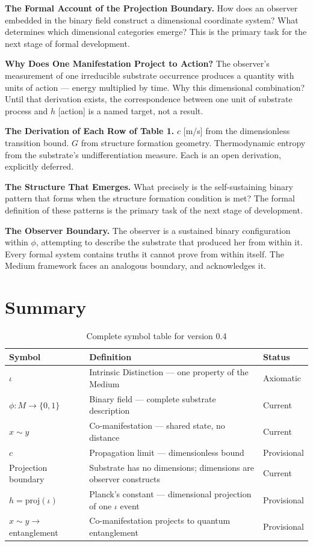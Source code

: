 \documentclass[11pt,letterpaper]{article}
\begin{document}
\textbf{The Formal Account of the Projection Boundary.} How does an observer embedded in the binary field construct a dimensional coordinate system? What determines which dimensional categories emerge? This is the primary task for the next stage of formal development.

\textbf{Why Does One Manifestation Project to Action?} The observer's measurement of one irreducible substrate occurrence produces a quantity with units of action --- energy multiplied by time. Why this dimensional combination? Until that derivation exists, the correspondence between one unit of substrate process and \(h\) {[}action] is a named target, not a result.

\textbf{The Derivation of Each Row of Table 1.} \(c\) {[}m/s] from the dimensionless transition bound. \(G\) from structure formation geometry. Thermodynamic entropy from the substrate's undifferentiation measure. Each is an open derivation, explicitly deferred.

\textbf{The Structure That Emerges.} What precisely is the self-sustaining binary pattern that forms when the structure formation condition is met? The formal definition of these patterns is the primary task of the next stage of development.

\textbf{The Observer Boundary.} The observer is a sustained binary configuration within \(\phi\), attempting to describe the substrate that produced her from within it. Every formal system contains truths it cannot prove from within itself. The Medium framework faces an analogous boundary, and acknowledges it.
\section{Summary}
\label{sec:org67ea7c6}

\begin{table}[htbp]
\caption{Complete symbol table for version 0.4}
\centering
\begin{tabular}{llp{3cm}}
\toprule
\textbf{Symbol} & \textbf{Definition} & \textbf{Status}\\
\midrule
\(\iota\) & Intrinsic Distinction --- one property of the Medium & Axiomatic\\
\(\phi : M \to \{0,1\}\) & Binary field --- complete substrate description & Current\\
\(x \sim y\) & Co-manifestation --- shared state, no distance & Current\\
\(c\) & Propagation limit --- dimensionless bound & Provisional\\
Projection boundary & Substrate has no dimensions; dimensions are observer constructs & Current\\
\(h = \mathrm{proj}(\iota)\) & Planck's constant --- dimensional projection of one \(\iota\) event & Provisional\\
\(x \sim y \to\) entanglement & Co-manifestation projects to quantum entanglement & Provisional\\
\bottomrule
\end{tabular}
\end{table}
\end{document}
